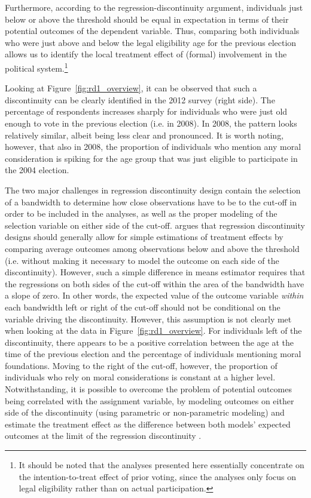 \documentclass[12pt]{article}
\begin{document}
Furthermore, according to the regression-discontinuity argument, individuals just below or above the threshold should be equal in expectation in terms of their potential outcomes of the dependent variable. Thus, comparing both individuals who were just above and below the legal eligibility age for the previous election allows us to identify the local treatment effect of (formal) involvement in the political system.\footnote{It should be noted that the analyses presented here essentially concentrate on the intention-to-treat effect of prior voting, since the analyses only focus on legal eligibility rather than on actual participation.}

Looking at Figure~\ref{fig:rd1_overview}, it can be observed that such a discontinuity can be clearly identified in the 2012 survey (right side). The percentage of respondents increases sharply for individuals who were just old enough to vote in the previous election (i.e. in 2008). In 2008, the pattern looks relatively similar, albeit being less clear and pronounced. It is worth noting, however, that also in 2008, the proportion of individuals who mention any moral consideration is spiking for the age group that was just eligible to participate in the 2004 election.

The two major challenges in regression discontinuity design contain the selection of a bandwidth to determine how close observations have to be to the cut-off in order to be included in the analyses, as well as the proper modeling of the selection variable on either side of the cut-off. \citet{dunning2012natural} argues that regression discontinuity designs should generally allow for simple estimations of treatment effects by comparing average outcomes among observations below and above the threshold (i.e. without making it necessary to model the outcome on each side of the discontinuity). However, such a simple difference in means estimator requires that the regressions on both sides of the cut-off within the area of the bandwidth have a slope of zero. In other words, the expected value of the outcome variable \textit{within} each bandwidth left or right of the cut-off should not be conditional on the variable driving the discontinuity. However, this assumption is not clearly met when looking at the data in Figure~\ref{fig:rd1_overview}. For individuals left of the discontinuity, there appears to be a positive correlation between the age at the time of the previous election and the percentage of individuals mentioning moral foundations. Moving to the right of the cut-off, however, the proportion of individuals who rely on moral considerations is constant at a higher level. Notwithstanding, it is possible to overcome the problem of potential outcomes being correlated with the assignment variable, by modeling outcomes on either side of the discontinuity (using parametric or non-parametric modeling) and estimate the treatment effect as the difference between both models' expected outcomes at the limit of the regression discontinuity \citep[see also][]{imbens2008regression}.
\end{document}
